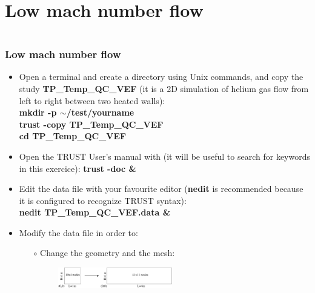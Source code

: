 \documentclass[10pt]{beamer}
\begin{document}
\section{Low mach number flow}
\begin{frame}
\begin{columns}[c] 
\tableofcontents[sections={1-6},currentsection, currentsubsection]
\tableofcontents[sections={7-12},currentsection, currentsubsection]
\end{columns}
\end{frame}
\begin{frame}
\frametitle{Low mach number flow}
\begin{block}{}

\begin{itemize}
\item Open a terminal and create a directory using Unix commands, and copy the study \textbf{TP\_Temp\_QC\_VEF} (it is a 2D simulation of helium gas flow from left to right between two heated walls):\\
\textbf{mkdir -p $\sim$/test/yourname}\\
\textbf{trust -copy TP\_Temp\_QC\_VEF}\\
\textbf{cd TP\_Temp\_QC\_VEF}

\item Open the TRUST User's manual with (it will be useful to search for keywords in this exercice): \textbf{trust -doc \&}

\item Edit the data file with your favourite editor (\textbf{nedit} is recommended because it is configured to recognize TRUST syntax):\\
\textbf{nedit TP\_Temp\_QC\_VEF.data \&}

\item Modify the data file in order to:
    \begin{itemize}
    \item [$\circ$] Change the geometry and the mesh:
    \begin{figure}
    \includegraphics[width=0.5\textwidth]{PICTURES/low_mach.pdf}
    \end{figure}
    \end{itemize}
\end{itemize}

\end{block}
\end{frame}
\end{document}
